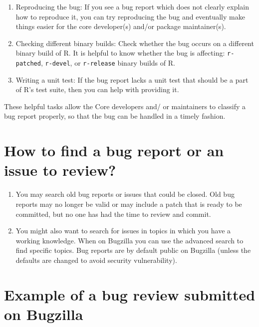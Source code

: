 \documentclass[
]{book}
\begin{document}
\begin{enumerate}
\def\labelenumi{\arabic{enumi}.}
\item
  Reproducing the bug: If you see a bug report which does not clearly explain how to reproduce it, you can try reproducing the bug and eventually make things easier for the core developer(s) and/or package maintainer(s).
\item
  Checking different binary builds: Check whether the bug occurs on a different binary build of R. It is helpful to know whether the bug is affecting: \texttt{r-patched}, \texttt{r-devel}, or \texttt{r-release} binary builds of R.
\item
  Writing a unit test: If the bug report lacks a unit test that should be a part of R's test suite, then you can help with providing it.
\end{enumerate}

These helpful tasks allow the Core developers and/ or maintainers to classify a bug report properly, so that the bug can be handled in a timely fashion.

\hypertarget{how-to-find-a-bug-report-or-an-issue-to-review}{%
\section{How to find a bug report or an issue to review?}\label{how-to-find-a-bug-report-or-an-issue-to-review}}

\begin{enumerate}
\def\labelenumi{\arabic{enumi}.}
\item
  You may search old bug reports or issues that could be closed. Old bug reports may no longer be valid or may include a patch that is ready to be committed, but no one has had the time to review and commit.
\item
  You might also want to search for issues in topics in which you have a working knowledge. When on Bugzilla you can use the advanced search to find specific topics. Bug reports are by default public on Bugzilla (unless the defaults are changed to avoid security vulnerability).
\end{enumerate}

\hypertarget{example-of-a-bug-review-submitted-on-bugzilla}{%
\section{Example of a bug review submitted on Bugzilla}\label{example-of-a-bug-review-submitted-on-bugzilla}}
\end{document}
